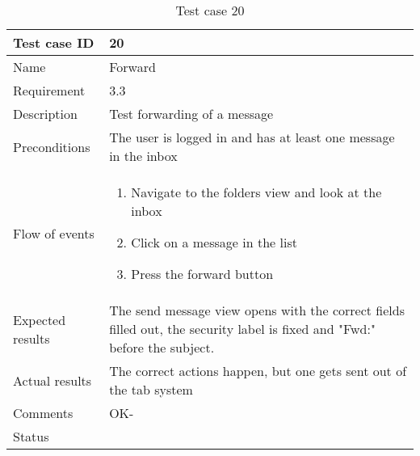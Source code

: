 		\begin{table}
			\begin{tabular}{l|p{10cm}}
				Test case ID & 20 \\ \hline
				Name & Forward\\ \hline
				Requirement & 3.3\\ \hline
				Description & Test forwarding of a message\\ \hline
				Preconditions & The user is logged in and has at least one message in the inbox\\ \hline
				Flow of events & 
					\begin{enumerate}
						\item{}Navigate to the folders view and look at the inbox
						\item{}Click on a message in the list
						\item{}Press the forward button
					\end{enumerate} \\ \hline
				Expected results & The send message view opens with the correct fields filled out, the security label is fixed and "Fwd:" before the subject. \\ \hline
				Actual results & The correct actions happen, but one gets sent out of the tab system\\ \hline
				Comments & OK-\\ \hline
				Status & \\ \hline
			\end{tabular}
			\caption{Test case 20} \label{tab:case20}
		\end{table}

